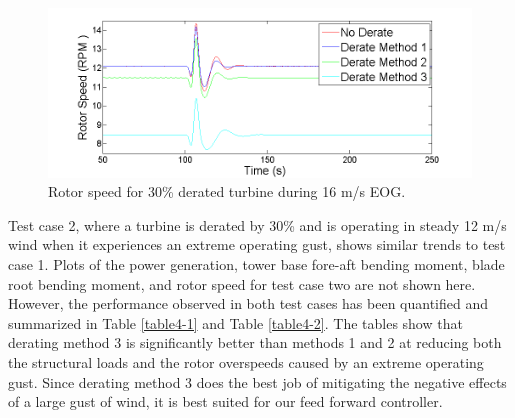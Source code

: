 \begin{figure}[htb]
	\centering
		\includegraphics[width = \linewidth]{Figures/ch4Figures/fig4-4.png}
		 
	\caption{Rotor speed for 30\% derated turbine during 16 m/s EOG.}
	\label{fig4-4}
\end{figure}


Test case 2, where a turbine is derated by 30\% and is operating in steady 12 m/s wind when it experiences an extreme operating gust, shows similar trends to test case 1. Plots of the power generation, tower base fore-aft bending moment, blade root bending moment, and rotor speed for test case two are not shown here. However, the performance observed in both test cases has been quantified and summarized in Table \ref{table4-1} and Table \ref{table4-2}. The tables show that derating method 3 is significantly better than methods 1 and 2 at reducing both the structural loads and the rotor overspeeds caused by an extreme operating gust. Since derating method 3 does the best job of mitigating the negative effects of a large gust of wind, it is best suited for our feed forward controller.  




